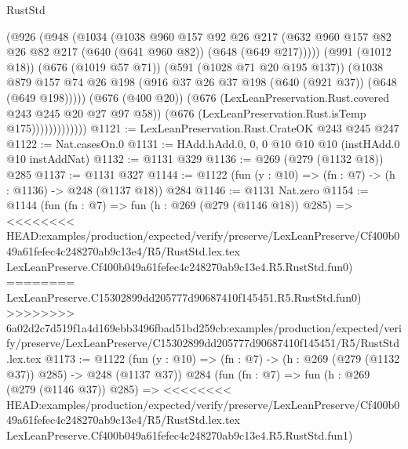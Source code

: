 \begin{lexlean}{RustStd}
\begin{coremodule}
{\begin{coremodule}
{{{{{{                        (@926
                          (@948
                            (@1034
                              (@1038
                                @960
                                @157
                                @92
                                @26
                                @217
                                (@632
                                  @960
                                  @157
                                  @82
                                  @26
                                  @82
                                  @217
                                  (@640 (@641 @960 @82))
                                  (@648 (@649 @217)))))
                            (@991 (@1012 @18))
                            (@676 (@1019 @57 @71))
                            (@591 (@1028 @71 @20 @195 @137))
                            (@1038
                              @879
                              @157
                              @74
                              @26
                              @198
                              (@916 @37 @26 @37 @198 (@640 (@921 @37)) (@648 (@649 @198)))))
                          (@676 (@400 @20))
                          (@676 (LexLeanPreservation.Rust.covered @243 @245 @20 @27 @97 @58))
                          (@676 (LexLeanPreservation.Rust.isTemp @175)))))))))))))
@1121 := LexLeanPreservation.Rust.CrateOK @243 @245 @247
@1122 := Nat.casesOn.{0}
@1131 := HAdd.hAdd.{0, 0, 0} @10 @10 @10 (instHAdd.{0} @10 instAddNat)
@1132 := @1131 @329
@1136 := @269 (@279 (@1132 @18)) @285
@1137 := @1131 @327
@1144 := @1122 (fun (y : @10) => (fn : @7) -> (h : @1136) -> @248 (@1137 @18)) @284
@1146 := @1131 Nat.zero
@1154 := @1144
    (fun (fn : @7) =>
    fun (h : @269 (@279 (@1146 @18)) @285) =>
<<<<<<<< HEAD:examples/production/expected/verify/preserve/LexLeanPreserve/Cf400b049a61fefec4c248270ab9c13e4/R5/RustStd.lex.tex
    LexLeanPreserve.Cf400b049a61fefec4c248270ab9c13e4.R5.RustStd.fun0)
========
    LexLeanPreserve.C15302899dd205777d90687410f145451.R5.RustStd.fun0)
>>>>>>>> 6a02d2c7d519f1a4d169ebb3496fbad51bd259cb:examples/production/expected/verify/preserve/LexLeanPreserve/C15302899dd205777d90687410f145451/R5/RustStd.lex.tex
@1173 := @1122
    (fun (y : @10) => (fn : @7) -> (h : @269 (@279 (@1132 @37)) @285) -> @248 (@1137 @37))
    @284
    (fun (fn : @7) =>
    fun (h : @269 (@279 (@1146 @37)) @285) =>
<<<<<<<< HEAD:examples/production/expected/verify/preserve/LexLeanPreserve/Cf400b049a61fefec4c248270ab9c13e4/R5/RustStd.lex.tex
    LexLeanPreserve.Cf400b049a61fefec4c248270ab9c13e4.R5.RustStd.fun1)
}}}}}}
\end{coremodule}}
\end{coremodule}
\end{lexlean}
